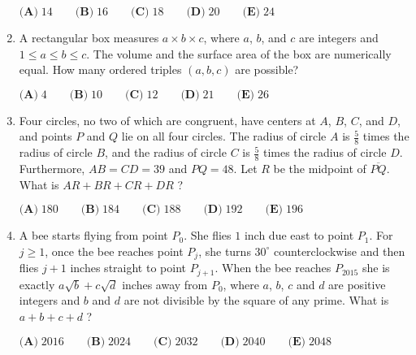 \documentclass{article}
\begin{document}
\begin{enumerate}[label=\arabic*., itemsep=0.5em]
$\textbf{(A)}\; 14 \qquad\textbf{(B)}\; 16 \qquad\textbf{(C)}\; 18 \qquad\textbf{(D)}\; 20 \qquad\textbf{(E)}\; 24$\par \vspace{0.5em}\item A rectangular box measures $a \times b \times c$, where $a$, $b$, and $c$ are integers and $1\leq a \leq b \leq c$. The volume and the surface area of the box are numerically equal. How many ordered triples $(a,b,c)$ are possible?

$\textbf{(A)}\; 4 \qquad\textbf{(B)}\; 10 \qquad\textbf{(C)}\; 12 \qquad\textbf{(D)}\; 21 \qquad\textbf{(E)}\; 26$\par \vspace{0.5em}\item Four circles, no two of which are congruent, have centers at $A$, $B$, $C$, and $D$, and points $P$ and $Q$ lie on all four circles. The radius of circle $A$ is $\tfrac{5}{8}$ times the radius of circle $B$, and the radius of circle $C$ is $\tfrac{5}{8}$ times the radius of circle $D$. Furthermore, $AB = CD = 39$ and $PQ = 48$. Let $R$ be the midpoint of $\overline{PQ}$. What is $AR+BR+CR+DR$ ?

$\textbf{(A)}\; 180 \qquad\textbf{(B)}\; 184 \qquad\textbf{(C)}\; 188 \qquad\textbf{(D)}\; 192\qquad\textbf{(E)}\; 196$\par \vspace{0.5em}\item A bee starts flying from point $P_0$. She flies $1$ inch due east to point $P_1$. For $j \ge 1$, once the bee reaches point $P_j$, she turns $30^{\circ}$ counterclockwise and then flies $j+1$ inches straight to point $P_{j+1}$. When the bee reaches $P_{2015}$ she is exactly $a \sqrt{b} + c \sqrt{d}$ inches away from $P_0$, where $a$, $b$, $c$ and $d$ are positive integers and $b$ and $d$ are not divisible by the square of any prime. What is $a+b+c+d$ ?

$\textbf{(A)}\; 2016 \qquad\textbf{(B)}\; 2024 \qquad\textbf{(C)}\; 2032 \qquad\textbf{(D)}\; 2040 \qquad\textbf{(E)}\; 2048$\par \vspace{0.5em}\end{enumerate}
\end{document}
